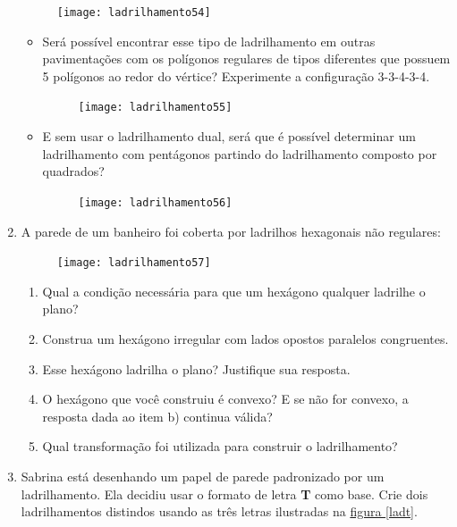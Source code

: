 \begin{enumerate}
\begin{figure}[H]
	\centering
	\texttt{[image: ladrilhamento54]}

\end{figure}

\begin{itemize}


\item Será possível encontrar esse tipo de ladrilhamento em outras pavimentações com os polígonos regulares de tipos diferentes que possuem 5 polígonos ao redor do vértice? 	Experimente a configuração 3-3-4-3-4.

	\begin{figure}[H]
	\centering
	\texttt{[image: ladrilhamento55]}

	\end{figure}

\item 	E sem usar o ladrilhamento dual, será que é possível determinar um ladrilhamento com pentágonos partindo do ladrilhamento composto por quadrados?

	\begin{figure}[H]
	\centering
	\texttt{[image: ladrilhamento56]}

	\end{figure}

\end{itemize}


\item  A parede de um banheiro foi coberta por ladrilhos hexagonais não regulares:

	\begin{figure}[H]
	\centering
	\texttt{[image: ladrilhamento57]}

	\end{figure}
	\begin{enumerate}
		\item Qual a condição necessária para que um hexágono qualquer ladrilhe o plano?
		\item Construa um hexágono irregular com lados opostos paralelos congruentes.
		\item Esse hexágono ladrilha o plano? Justifique sua resposta.
		\item O hexágono que você construiu é convexo? E se não for convexo, a resposta dada ao item b) continua válida?
		\item Qual transformação foi utilizada para construir o ladrilhamento?
	\end{enumerate}
	
	
\item 
Sabrina está desenhando um papel de parede padronizado por um ladrilhamento. Ela decidiu usar o formato de letra \textbf{T} como base. Crie dois ladrilhamentos distindos usando as três letras ilustradas na \hyperref[ladt]{figura \ref{ladt}}.


\end{enumerate}
